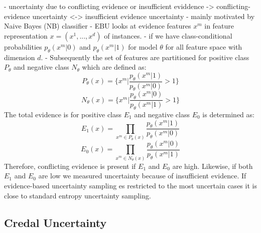 - uncertainty due to conflicting evidence or insufficient eviddence
-> conflicting-evidence uncertainty <-> insufficient evidence uncertainty
- mainly motivated by Naive Bayes (NB) classifier
- EBU looks at evidence features $x^m$ in feature representation $x = (x^1, ..., x^d)$ of instances. 
- if we have class-conditional probabilities $p_{\theta}(x^m|0)$ and $p_{\theta}(x^m|1)$ for model $\theta$ for all feature space with dimension $d$.
- Subsequently the set of features are partitioned for positive class $P_{\theta}$ and negative class $N_{\theta}$ which are defined as:
\begin{equation}
    P_{\theta}(x) = \bigg\{ x^m \bigg| \frac{p_{\theta}(x^m|1)}{p_{\theta}(x^m|0)} > 1 \bigg\} 
\end{equation}
 \begin{equation}
    N_{\theta}(x) = \bigg\{ x^m \bigg| \frac{p_{\theta}(x^m|0)}{p_{\theta}(x^m|1)} > 1 \bigg\} 
\end{equation}
The total evidence is for positive class $E_1$ and negative class $E_0$ is determined as:
\begin{equation}
    E_1(x) = \prod\limits_{x^m \in P_{\theta}(x)} \frac{p_{\theta}(x^m|1)}{p_{\theta}(x^m|0)}
\end{equation}
\begin{equation}
    E_0(x) = \prod\limits_{x^m \in N_{\theta}(x)} \frac{p_{\theta}(x^m|0)}{p_{\theta}(x^m|1)}
\end{equation} 
Therefore, conflicting evidence is present if $E_1$ and $E_0$ are high.
Likewise, if both $E_1$ and $E_0$ are low we measured uncertainty because of insufficient evidence.
If evidence-based uncertainty sampling es restricted to the most uncertain cases it is close to standard entropy uncertainty sampling.




\subsection{Credal Uncertainty}    

